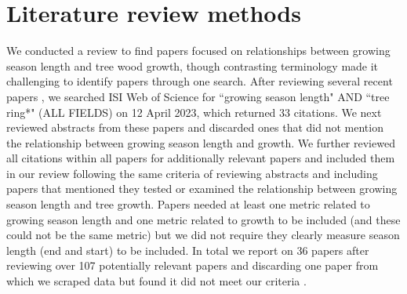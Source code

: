 \documentclass[11pt]{article}
\begin{document}
\renewcommand{\refname}{\CHead{}}

\renewcommand{\thetable}{S\arabic{table}}
\renewcommand{\thefigure}{S\arabic{figure}}


\section*{Literature review methods}

We conducted a review to find papers focused on relationships between growing season length and tree wood growth, though contrasting terminology made it challenging to identify papers through one search. After reviewing several recent papers \citep{dow2022warm,zohner2023effect}, we searched ISI Web of Science for ``growing season length" AND ``tree ring*" (ALL FIELDS) on 12 April 2023, which returned 33 citations. We next reviewed abstracts from these papers and discarded ones that did not mention the relationship between growing season length and growth. We further reviewed all citations within all papers for additionally relevant papers and included them in our review following the same criteria of reviewing abstracts and including papers that mentioned they tested or examined the relationship between growing season length and tree growth. Papers needed at least one metric related to growing season length and one metric related to growth to be included (and these could not be the same metric) but we did not require they clearly measure season length (end and start) to be included. In total we report on 36 papers after reviewing over 107 potentially relevant papers and discarding one paper from which we scraped data but found it did not meet our criteria \citep[][because it used tree rings as a metric of both growth and growing season length]{bruening2017}. %
\end{document}
